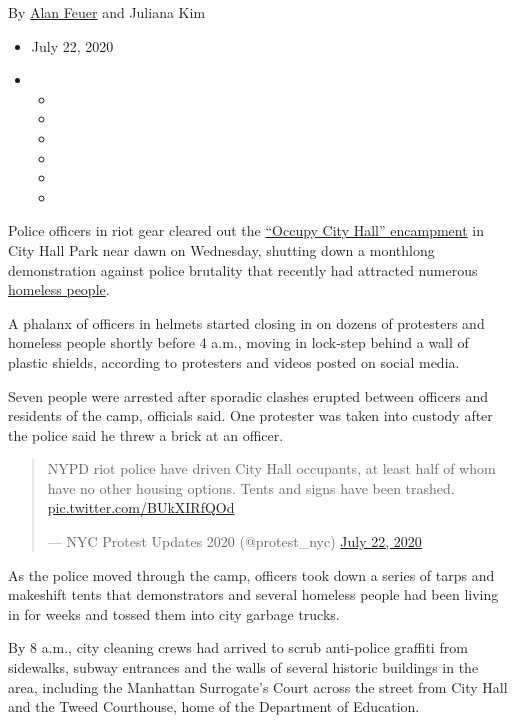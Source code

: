 By \href{https://www.nytimes3xbfgragh.onion/by/alan-feuer}{Alan Feuer}
and Juliana Kim

\begin{itemize}
\item
  July 22, 2020
\item
  \begin{itemize}
  \item
  \item
  \item
  \item
  \item
  \item
  \end{itemize}
\end{itemize}

Police officers in riot gear cleared out the
\href{https://www.nytimes3xbfgragh.onion/2020/06/28/nyregion/occupy-city-hall-nyc.html}{``Occupy
City Hall'' encampment} in City Hall Park near dawn on Wednesday,
shutting down a monthlong demonstration against police brutality that
recently had attracted numerous
\href{https://www.nytimes3xbfgragh.onion/2020/07/09/nyregion/occupy-city-hall-nyc-homeless.html}{homeless
people}.

A phalanx of officers in helmets started closing in on dozens of
protesters and homeless people shortly before 4 a.m., moving in
lock-step behind a wall of plastic shields, according to protesters and
videos posted on social media.

Seven people were arrested after sporadic clashes erupted between
officers and residents of the camp, officials said. One protester was
taken into custody after the police said he threw a brick at an officer.

\begin{quote}
NYPD riot police have driven City Hall occupants, at least half of whom
have no other housing options. Tents and signs have been trashed.
\href{https://t.co/BUkXIRfQOd}{pic.twitter.com/BUkXIRfQOd}

--- NYC Protest Updates 2020 (@protest\_nyc)
\href{https://twitter.com/protest_nyc/status/1285846628012896258?ref_src=twsrc\%5Etfw}{July
22, 2020}
\end{quote}

As the police moved through the camp, officers took down a series of
tarps and makeshift tents that demonstrators and several homeless people
had been living in for weeks and tossed them into city garbage trucks.

By 8 a.m., city cleaning crews had arrived to scrub anti-police graffiti
from sidewalks, subway entrances and the walls of several historic
buildings in the area, including the Manhattan Surrogate's Court across
the street from City Hall and the Tweed Courthouse, home of the
Department of Education.

